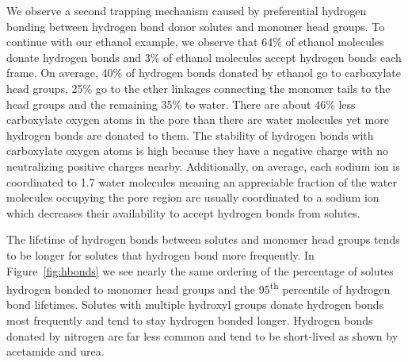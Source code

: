 \documentclass[journal=jpcbfk,manuscript=article]{achemso}
\begin{document}
  We observe a second trapping mechanism caused by preferential hydrogen 
  bonding between hydrogen bond donor solutes and monomer head groups. To 
  continue with our ethanol example, we observe that 64\% of ethanol
  molecules donate hydrogen bonds  %
  and 3\% of ethanol molecules accept hydrogen bonds each frame. On average, 40\%
  of hydrogen bonds donated by ethanol go to carboxylate %
  head groups, 25\% go to the ether linkages connecting the monomer tails to the 
  head groups and the remaining 35\% to water. There are about 46\% less  %
  carboxylate oxygen atoms in the pore than there are water molecules yet more
  hydrogen bonds are donated to them. The stability of hydrogen bonds with 
  carboxylate oxygen atoms is high because they have a negative charge
  with no neutralizing positive charges nearby. Additionally, on average, 
  each sodium ion is coordinated to 1.7 water molecules meaning an appreciable
  fraction of the water molecules occupying the pore region are usually 
  coordinated to a sodium ion which decreases their availability to accept 
  hydrogen bonds from solutes.
  
  The lifetime of hydrogen bonds between solutes and monomer head groups tends to 
  be longer for solutes that hydrogen bond more frequently. In Figure~\ref{fig:hbonds}
  we see nearly the same ordering of the percentage of solutes hydrogen bonded to
  monomer head groups and the 95\textsuperscript{th} percentile of hydrogen bond 
  lifetimes. Solutes with multiple hydroxyl groups donate hydrogen bonds most 
  frequently and tend to stay hydrogen bonded longer. Hydrogen bonds donated by
  nitrogen are far less common and tend to be short-lived as shown by acetamide
  and urea.
\end{document}
